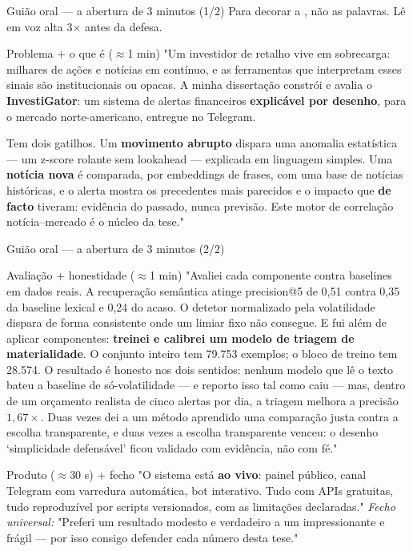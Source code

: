 \documentclass[aspectratio=169,11pt]{beamer}
\newcommand{\key}[1]{\textbf{\structure{#1}}}
\begin{document}
\begin{frame}{Guião oral — a abertura de 3 minutos (1/2)}
\footnotesize
Para decorar a \key{estrutura}, não as palavras. Lê em voz alta 3$\times$ antes da defesa.
\begin{block}{\scriptsize Problema + o que é (\(\approx\)1 min)}
\scriptsize "Um investidor de retalho vive em sobrecarga: milhares de ações e notícias em contínuo,
e as ferramentas que interpretam esses sinais são institucionais ou opacas. A minha dissertação
constrói e avalia o \textbf{InvestiGator}: um sistema de alertas financeiros \textbf{explicável
por desenho}, para o mercado norte-americano, entregue no Telegram.

Tem dois gatilhos. Um \textbf{movimento abrupto} dispara uma anomalia estatística --- um z-score
rolante sem lookahead --- explicada em linguagem simples. Uma \textbf{notícia nova} é comparada,
por embeddings de frases, com uma base de notícias históricas, e o alerta mostra os precedentes
mais parecidos e o impacto que \textbf{de facto} tiveram: evidência do passado, nunca previsão.
Este motor de correlação notícia--mercado é o núcleo da tese."
\end{block}
\end{frame}

\begin{frame}{Guião oral — a abertura de 3 minutos (2/2)}
\begin{block}{\scriptsize Avaliação + honestidade (\(\approx\)1 min)}
\scriptsize "Avaliei cada componente contra baselines em dados reais. A recuperação semântica
atinge precision@5 de 0,51 contra 0,35 da baseline lexical e 0,24 do acaso. O detetor normalizado
pela volatilidade dispara de forma consistente onde um limiar fixo não consegue. E fui além de
aplicar componentes: \textbf{treinei e calibrei um modelo de triagem de materialidade}. O conjunto
inteiro tem 79.753 exemplos; o bloco de treino tem 28.574. O resultado é honesto nos dois sentidos: nenhum modelo que lê o
texto bateu a baseline de só-volatilidade --- e reporto isso tal como caiu --- mas, dentro de um
orçamento realista de cinco alertas por dia, a triagem melhora a precisão \textbf{$1{,}67\times$}.
Duas vezes dei a um método aprendido uma comparação justa contra a escolha transparente, e duas
vezes a escolha transparente venceu: o desenho `simplicidade defensável' ficou validado com
evidência, não com fé."
\end{block}
\begin{block}{\scriptsize Produto (\(\approx\)30 s) + fecho}
\scriptsize "O sistema está \textbf{ao vivo}: painel público, canal Telegram com varredura
automática, bot interativo. Tudo com APIs gratuitas, tudo reproduzível por scripts versionados,
com as limitações declaradas." \quad \emph{Fecho universal:} "Preferi um resultado modesto e
verdadeiro a um impressionante e frágil --- por isso consigo defender cada número desta tese."
\end{block}
\end{frame}
\end{document}
